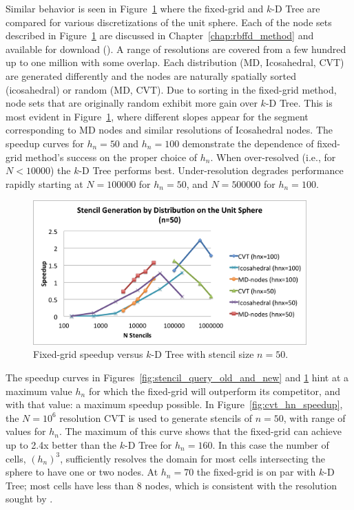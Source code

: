 \documentclass{report}
\begin{document}
Similar behavior is seen in Figure~\ref{fig:speedup_sphere} where the fixed-grid and $k$-D Tree are compared for various discretizations of the unit sphere. Each of the node sets described in Figure~\ref{fig:speedup_sphere} are discussed in Chapter~\ref{chap:rbffd_method} and available for download (\cite{BolligSphereGrids}). A range of resolutions are covered from a few hundred up to one million with some overlap. Each distribution (MD, Icosahedral, CVT) are generated differently and the nodes are naturally spatially sorted (icosahedral) or random (MD, CVT). Due to sorting in the fixed-grid method, node sets that are originally random exhibit more gain over $k$-D Tree. This is most evident in Figure~\ref{fig:speedup_sphere}, where different slopes appear for the segment corresponding to MD nodes and similar resolutions of Icosahedral nodes. The speedup curves for $h_n=50$ and $h_n=100$ demonstrate the dependence of fixed-grid method's success on the proper choice of $h_n$. When over-resolved (i.e., for $N < 10000$) the $k$-D Tree performs best. Under-resolution degrades performance rapidly starting at $N=100000$ for $h_n=50$, and $N=500000$ for $h_n=100$. 


\begin{figure}
\centering
\includegraphics[width=10.5cm]{../figures/stencils/sphere_stencil_gen_speedup.png}
\caption{Fixed-grid speedup versus $k$-D Tree with stencil size $n=50$.}
\label{fig:speedup_sphere}
\end{figure}


The speedup curves in Figures~\ref{fig:stencil_query_old_and_new} and \ref{fig:speedup_sphere} hint at a maximum value $h_n$ for which the fixed-grid will outperform its competitor, and with that value: a maximum speedup possible. In Figure~\ref{fig:cvt_hn_speedup}, the $N=10^6$ resolution CVT is used to generate stencils of $n=50$, with range of values for $h_n$. The maximum of this curve shows that the fixed-grid can achieve up to 2.4x better than the $k$-D Tree for $h_n=160$. In this case the number of cells, $(h_n)^3$, sufficiently resolves the domain for most cells intersecting the sphere to have one or two nodes. At $h_n=70$ the fixed-grid is on par with $k$-D Tree; most cells have less than 8 nodes, which is consistent with the resolution sought by \cite{Krog2010,Goswami2010,Green2010}.
\end{document}
